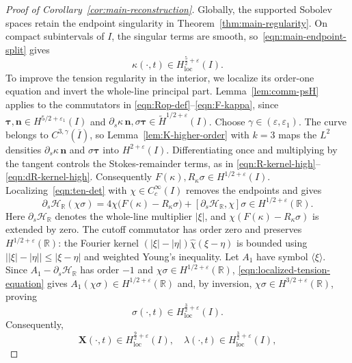 \documentclass[11pt,reqno]{amsart}
\theoremstyle{plain}
\theoremstyle{definition}
\numberwithin{equation}{section}
\newcommand{\p}{\partial}
\newcommand{\mc}[1]{\mathcal{#1}}
\newcommand{\wt}[1]{\widetilde{#1}}
\newcommand{\bm}[1]{\boldsymbol{#1}}
\newcommand{\R}{\mathbb{R}}
\newcommand{\thi}[1]{\wt H^{#1}(I)}
\begin{document}
\begin{proof}[Proof of Corollary~\ref{cor:main-reconstruction}]
Globally, the supported Sobolev spaces retain the endpoint singularity
in Theorem~\ref{thm:main-regularity}. On compact subintervals of $I$,
the singular terms are smooth, so~\eqref{eqn:main-endpoint-split} gives
\begin{equation}
    \kappa(\cdot,t)\in H^{\frac52+\varepsilon}_{\mathrm{loc}}(I).
\end{equation}
To improve the tension regularity in the interior, we localize its
order-one equation and invert the whole-line principal part.
Lemma~\ref{lem:comm-psH} applies to the commutators in
\eqref{eqn:Rop-def}--\eqref{eqn:F-kappa}, since
$\bm\tau,\bm n\in H^{5/2+\varepsilon_1}(I)$ and
$\p_s\kappa\,\bm n,\sigma\bm\tau\in\thi{1/2+\varepsilon}$.
Choose $\gamma\in(\varepsilon,\varepsilon_1)$. The curve belongs to
$C^{3,\gamma}(\overline I)$, so Lemma~\ref{lem:K-higher-order} with $k=3$
maps the $L^2$ densities $\p_s\kappa\,\bm n$ and $\sigma\bm\tau$ into
$H^{2+\varepsilon}(I)$. Differentiating once and multiplying by the
tangent controls the Stokes-remainder terms, as in
\eqref{eqn:R-kernel-high}--\eqref{eqn:dR-kernel-high}.
Consequently $F(\kappa),R_\kappa\sigma\in H^{1/2+\varepsilon}(I)$.
Localizing~\eqref{eqn:ten-det} with $\chi\in C_c^\infty(I)$ removes
the endpoints and gives
\begin{equation}\label{eqn:localized-tension-equation}
    \p_s\mc H_{\R}(\chi\sigma)
    =4\chi\bigl(F(\kappa)-R_\kappa\sigma\bigr)
    +[\p_s\mc H_{\R},\chi]\sigma
    \in H^{1/2+\varepsilon}(\R).
\end{equation}
Here $\p_s\mc H_{\R}$ denotes the whole-line multiplier $|\xi|$, and
$\chi(F(\kappa)-R_\kappa\sigma)$ is extended by zero. The cutoff
commutator has order zero and preserves $H^{1/2+\varepsilon}(\R)$:
the Fourier kernel
$(|\xi|-|\eta|)\widehat\chi(\xi-\eta)$ is bounded using
$\bigl||\xi|-|\eta|\bigr|\le|\xi-\eta|$ and weighted Young's inequality.
Let $A_1$ have symbol $\langle\xi\rangle$.
Since $A_1-\p_s\mc H_{\R}$ has order $-1$ and
$\chi\sigma\in H^{1/2+\varepsilon}(\R)$,
\eqref{eqn:localized-tension-equation} gives
$A_1(\chi\sigma)\in H^{1/2+\varepsilon}(\R)$ and, by inversion,
$\chi\sigma\in H^{3/2+\varepsilon}(\R)$, proving
\begin{equation}\label{eqn:interior-tension-regularity}
    \sigma(\cdot,t)\in H^{\frac32+\varepsilon}_{\mathrm{loc}}(I).
\end{equation}
Consequently,
\begin{equation}
    \bm X(\cdot,t)\in H^{\frac92+\varepsilon}_{\mathrm{loc}}(I),
    \quad
    \lambda(\cdot,t)\in H^{\frac32+\varepsilon}_{\mathrm{loc}}(I),

\end{equation}
\end{proof}
\end{document}
